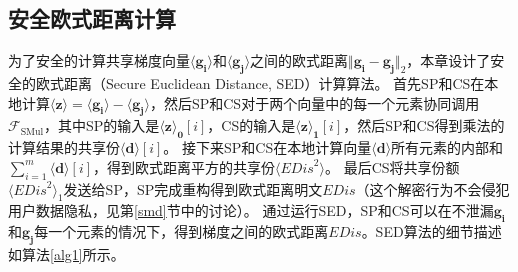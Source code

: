 \begin{table}
	\centering
	\caption{符号说明}
	\label{table-sym}
\end{table}

\subsection{安全欧式距离计算}
为了安全的计算共享梯度向量$\boldsymbol{\langle g_i\rangle}$和$\boldsymbol{\langle g_j\rangle}$之间的欧式距离$\Vert \boldsymbol{g_i} - \boldsymbol{g_j} \Vert_2$，本章设计了安全的欧式距离（Secure Euclidean Distance, SED）计算算法。
首先SP和CS在本地计算$\boldsymbol{\langle z\rangle} = \boldsymbol{\langle g_i\rangle} - \boldsymbol{\langle g_j\rangle}$，然后SP和CS对于两个向量中的每一个元素协同调用$\mathcal{F}_{\text {SMul}}$，其中SP的输入是$\boldsymbol{\langle z\rangle_0}[i]$，CS的输入是$\boldsymbol{\langle z\rangle_1}[i]$，然后SP和CS得到乘法的计算结果的共享份$\boldsymbol{\langle d\rangle}[i]$。
接下来SP和CS在本地计算向量$\boldsymbol{\langle d\rangle}$所有元素的内部和$\sum_{i=1}^{m} \boldsymbol{\langle d\rangle}[i]$，得到欧式距离平方的共享份$\langle \textit{EDis}^2\rangle$。
最后CS将共享份额$\langle \textit{EDis}^2\rangle_1$发送给SP，SP完成重构得到欧式距离明文$\textit{EDis}$（这个解密行为不会侵犯用户数据隐私，见第\ref{smd}节中的讨论）。
通过运行SED，SP和CS可以在不泄漏$\boldsymbol{g_i}$和$\boldsymbol{g_j}$每一个元素的情况下，得到梯度之间的欧式距离$\textit{EDis}$。SED算法的细节描述如算法\ref{alg1}所示。


